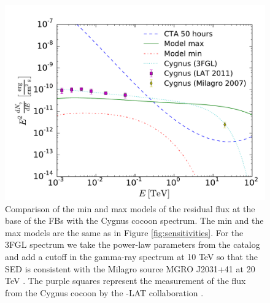 \begin{figure}[h]
\hspace{-2mm}
 \includegraphics[width=\onepic\textwidth]{plots/low_lat_FB_CTA_cygnus.pdf}
 \caption{
 Comparison of the min and max models of the residual flux at the base of the FBs with the Cygnus cocoon spectrum. 
 The min and the max models are the same as in Figure \ref{fig:sensitivities}.
 For the 3FGL spectrum we take the power-law parameters from the catalog \citep{2015ApJS..218...23A}
 and add a cutoff in the gamma-ray spectrum at 10 TeV so that the SED is consistent with the Milagro source MGRO J2031+41 
 at 20 TeV \citep{2007ApJ...664L..91A}.
The purple squares represent the measurement of the flux from the Cygnus cocoon by the \Fermi-LAT collaboration
\citep{2011Sci...334.1103A}.
 }
 \label{fig:cygnus}
\end{figure}

